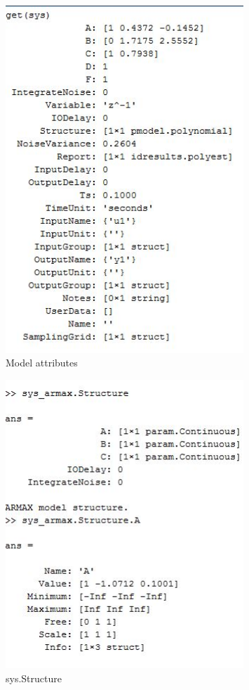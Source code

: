 \documentclass[a4paper,12pt]{report}
\begin{document}
		
		\begin{figure}[tbp]
			\centering
			\includegraphics[width=0.8\textwidth]{modMat2.JPG}
			\caption{Model attributes}
			\label{}
		\end{figure}
	
		\begin{figure}[tbp]
		\centering
		\includegraphics[width=0.8\textwidth]{StruMat.JPG}
		\caption{sys.Structure}
		\label{}
	\end{figure}
	
\end{document}

